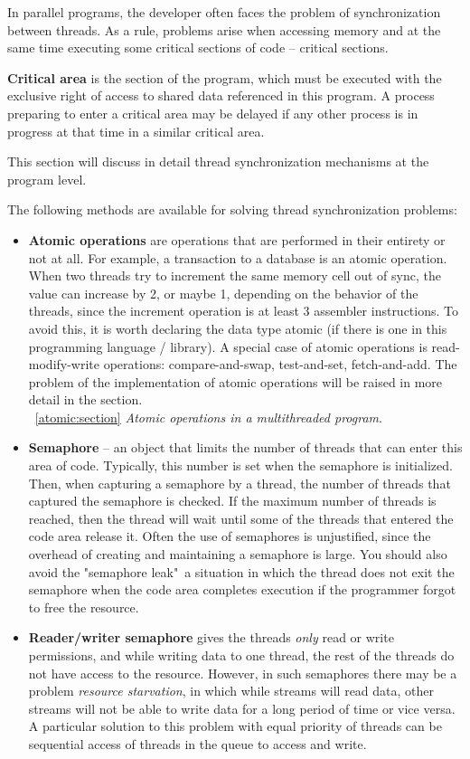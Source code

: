 { %
	\par In parallel programs, the developer often faces the problem of synchronization between threads. As a rule, problems arise when accessing memory and at the same time executing some critical sections of code – critical sections.
	\par\textbf{Critical area} is the section of the program, which must be executed with the exclusive right of access to shared data referenced in this program. A process preparing to enter a critical area may be delayed if any other process is in progress at that time in a similar critical area. 
	\par This section will discuss in detail thread synchronization mechanisms at the program level.
	\par The following methods are available for solving thread synchronization problems:
		\begin{itemize}
			\item\textbf{Atomic operations} are operations that are performed in their entirety or not at all. For example, a transaction to a database is an atomic operation. When two threads try to increment the same memory cell out of sync, the value can increase by 2, or maybe 1, depending on the behavior of the threads, since the increment operation is at least 3 assembler instructions. To avoid this, it is worth declaring the data type atomic (if there is one in this programming language / library). A special case of atomic operations is read-modify-write operations: compare-and-swap, test-and-set, fetch-and-add. The problem of the implementation of atomic operations will be raised in more detail in the section.\\~\ref{atomic:section} \textit{Atomic operations in a multithreaded program}.
			\item\textbf{Semaphore} – an object that limits the number of threads that can enter this area of code. Typically, this number is set when the semaphore is initialized. Then, when capturing a semaphore by a thread, the number of threads that captured the semaphore is checked. If the maximum number of threads is reached, then the thread will wait until some of the threads that entered the code area release it. Often the use of semaphores is unjustified, since the overhead of creating and maintaining a semaphore is large. You should also avoid the "semaphore leak"\ a situation in which the thread does not exit the semaphore when the code area completes execution if the programmer forgot to free the resource.
			\item\textbf{Reader/writer semaphore} gives the threads \textit{only} read or write permissions, and while writing data to one thread, the rest of the threads do not have access to the resource. However, in such semaphores there may be a problem \textit{resource starvation}, in which while streams will read data, other streams will not be able to write data for a long period of time or vice versa. A particular solution to this problem with equal priority of threads can be sequential access of threads in the queue to access and write.

\end{itemize}}
